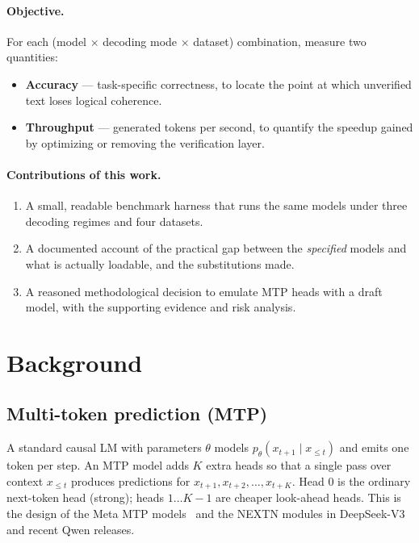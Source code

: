 \documentclass[11pt]{article}
\begin{document}
\paragraph{Objective.} For each (model $\times$ decoding mode $\times$ dataset)
combination, measure two quantities:
\begin{itemize}[nosep]
  \item \textbf{Accuracy} --- task-specific correctness, to locate the point at
        which unverified text loses logical coherence.
  \item \textbf{Throughput} --- generated tokens per second, to quantify the
        speedup gained by optimizing or removing the verification layer.
\end{itemize}

\paragraph{Contributions of this work.}
\begin{enumerate}[nosep]
  \item A small, readable benchmark harness that runs the same models under
        three decoding regimes and four datasets.
  \item A documented account of the practical gap between the \emph{specified}
        models and what is actually loadable, and the substitutions made.
  \item A reasoned methodological decision to emulate MTP heads with a draft
        model, with the supporting evidence and risk analysis.
\end{enumerate}

\section{Background}
\subsection{Multi-token prediction (MTP)}
A standard causal LM with parameters $\theta$ models
$p_\theta(x_{t+1}\mid x_{\le t})$ and emits one token per step. An MTP model adds
$K$ extra heads so that a single pass over context $x_{\le t}$ produces
predictions for $x_{t+1},x_{t+2},\dots,x_{t+K}$. Head $0$ is the ordinary
next-token head (strong); heads $1\dots K{-}1$ are cheaper look-ahead heads.
This is the design of the Meta MTP models~\cite{gloeckle2024} and the NEXTN
modules in DeepSeek-V3~\cite{deepseekv3} and recent Qwen releases.
\end{document}

